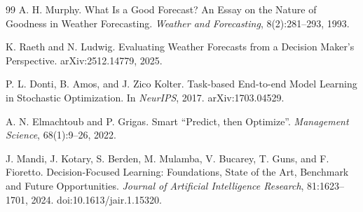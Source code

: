 \documentclass{article}
\begin{document}
\begin{thebibliography}{99}
A. H. Murphy.
\newblock What Is a Good Forecast? An Essay on the Nature of Goodness in Weather Forecasting.
\newblock \emph{Weather and Forecasting}, 8(2):281--293, 1993.

K. Raeth and N. Ludwig.
\newblock Evaluating Weather Forecasts from a Decision Maker's Perspective.
\newblock arXiv:2512.14779, 2025.

P. L. Donti, B. Amos, and J. Zico Kolter.
\newblock Task-based End-to-end Model Learning in Stochastic Optimization.
\newblock In \emph{NeurIPS}, 2017. arXiv:1703.04529.

A. N. Elmachtoub and P. Grigas.
\newblock Smart ``Predict, then Optimize''.
\newblock \emph{Management Science}, 68(1):9--26, 2022.

J. Mandi, J. Kotary, S. Berden, M. Mulamba, V. Bucarey, T. Guns, and F. Fioretto.
\newblock Decision-Focused Learning: Foundations, State of the Art, Benchmark and Future Opportunities.
\newblock \emph{Journal of Artificial Intelligence Research}, 81:1623--1701, 2024. doi:10.1613/jair.1.15320.
\end{thebibliography}
\endgroup

\clearpage
\appendix
\onecolumn

\setcounter{figure}{0}
\setcounter{table}{0}
\renewcommand{\thefigure}{A\arabic{figure}}
\renewcommand{\thetable}{A\arabic{table}}
\renewcommand{\theHfigure}{A\arabic{figure}}
\renewcommand{\theHtable}{A\arabic{table}}

\captionsetup{font=footnotesize}
\setlength{\floatsep}{6pt plus 2pt minus 2pt}
\setlength{\textfloatsep}{7pt plus 2pt minus 2pt}
\setlength{\intextsep}{7pt plus 2pt minus 2pt}
\setlength{\abovecaptionskip}{3pt}
\setlength{\belowcaptionskip}{0pt}

\providecommand{\appfigwidth}{0.92\linewidth}
\providecommand{\appwidefigwidth}{0.98\linewidth}
\providecommand{\appwidetablewidth}{0.92\linewidth}
\providecommand{\appmidtablewidth}{0.80\linewidth}
\providecommand{\appnarrowtablewidth}{0.79\linewidth}
\providecommand{\appcontexttablewidth}{\appmidtablewidth}
\providecommand{\apptablesize}{\small}
\providecommand{\apptighttablesize}{\footnotesize}

\setlength{\tabcolsep}{3.6pt}
\renewcommand{\arraystretch}{1.00}
\end{document}
